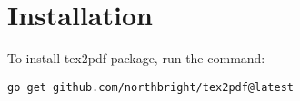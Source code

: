 \section{Installation}

To install tex2pdf package, run the command:

\begin{verbatim}
go get github.com/northbright/tex2pdf@latest
\end{verbatim}

